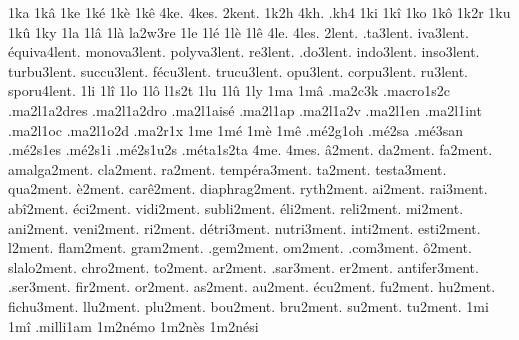 {%
1ka
1kâ
1ke
1ké
1kè
1kê
4ke.
4kes.
2kent. %
1k2h
4kh.
.kh4
1ki
1kî
1ko
1kô
1k2r
1ku
1kû
1ky
1la
1lâ
1là
                    la2w3re
1le
1lé
1lè
1lê
4le.
4les.
      2lent.
   .ta3lent.
   iva3lent.
équiva4lent.
monova3lent.
polyva3lent.
    re3lent.
   .do3lent.
  indo3lent.
  inso3lent.
 turbu3lent.
 succu3lent.
  fécu3lent.
 trucu3lent.
   opu3lent.
 corpu3lent.
    ru3lent.
 sporu4lent.
%
1li
1lî
1lo
1lô
l1s2t
1lu
1lû
1ly
1ma
1mâ
                    .ma2c3k
                    .macro1s2c
                    .ma2l1a2dres
                    .ma2l1a2dro
                    .ma2l1aisé
                    .ma2l1ap
                    .ma2l1a2v
                    .ma2l1en
                    .ma2l1int
                    .ma2l1oc
                    .ma2l1o2d
                    .ma2r1x %
1me
1mé
1mè
1mê
                    .mé2g1oh
                    .mé2sa %
                    .mé3san %
                    .mé2s1es
                    .mé2s1i
                    .mé2s1u2s
                    .méta1s2ta
4me.
4mes.
       â2ment.
       da2ment.
       fa2ment.
   amalga2ment.
      cla2ment.
       ra2ment.
  tempéra3ment.
       ta2ment.
    testa3ment.
      qua2ment.
        è2ment.
     carê2ment.
 diaphrag2ment.
     ryth2ment.
       ai2ment.
      rai3ment.
      abî2ment.
      éci2ment.
     vidi2ment.
    subli2ment.
      éli2ment.
     reli2ment.
       mi2ment.
      ani2ment.
     veni2ment.
       ri2ment.
    détri3ment.
    nutri3ment.
     inti2ment.
     esti2ment.
        l2ment.
     flam2ment.
     gram2ment.
     .gem2ment.
       om2ment.
     .com3ment.
        ô2ment.
    slalo2ment.
     chro2ment.
       to2ment.
       ar2ment.
     .sar3ment.
       er2ment.
  antifer3ment.
     .ser3ment.
      fir2ment.
       or2ment.
       as2ment.
       au2ment.
      écu2ment.
       fu2ment.
       hu2ment.
    fichu3ment.
      llu2ment.
      plu2ment.
      bou2ment.
      bru2ment.
       su2ment.
       tu2ment.
%
1mi
1mî
                    .milli1am
                    1m2némo
                    1m2nès
                    1m2nési
}
